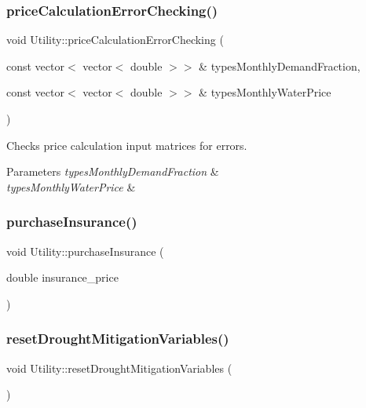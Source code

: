 \subsubsection{\texorpdfstring{price\+Calculation\+Error\+Checking()}{priceCalculationErrorChecking()}}
{\footnotesize\ttfamily void Utility\+::price\+Calculation\+Error\+Checking (\begin{DoxyParamCaption}\item[{const vector$<$ vector$<$ double $>$$>$ \&}]{types\+Monthly\+Demand\+Fraction,  }\item[{const vector$<$ vector$<$ double $>$$>$ \&}]{types\+Monthly\+Water\+Price }\end{DoxyParamCaption})}

Checks price calculation input matrices for errors. 
\begin{DoxyParams}{Parameters}
{\em types\+Monthly\+Demand\+Fraction} & \\
\hline
{\em types\+Monthly\+Water\+Price} & \\
\hline
\end{DoxyParams}
\mbox{\label{classUtility_a97073e3d7a30275c639484b3158284fa_a97073e3d7a30275c639484b3158284fa}} 
\subsubsection{\texorpdfstring{purchase\+Insurance()}{purchaseInsurance()}}
{\footnotesize\ttfamily void Utility\+::purchase\+Insurance (\begin{DoxyParamCaption}\item[{double}]{insurance\+\_\+price }\end{DoxyParamCaption})}

\mbox{\label{classUtility_af9ec9c2cb69166db021f03ce9ddf4d8e_af9ec9c2cb69166db021f03ce9ddf4d8e}} 
\subsubsection{\texorpdfstring{reset\+Drought\+Mitigation\+Variables()}{resetDroughtMitigationVariables()}}
{\footnotesize\ttfamily void Utility\+::reset\+Drought\+Mitigation\+Variables (\begin{DoxyParamCaption}{ }\end{DoxyParamCaption})}

